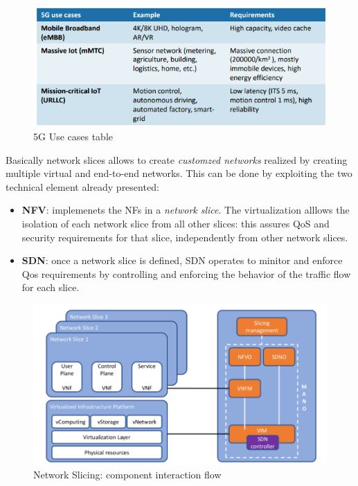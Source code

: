 \documentclass[10pt,a4paper]{report}
\theoremstyle{definition}
\begin{document}
\begin{figure}[h]
	\centering\includegraphics[scale=0.50]{images/Pasted image 20230420150151.png}
	\caption{5G Use cases table}
	\label{5g-use-cases-table}
\end{figure}
Basically network slices allows to create \textit{customzed networks} realized by creating multiple virtual and end-to-end networks.
This can be done by exploiting the two technical element already presented:
\begin{itemize}
	\item \textbf{NFV}: implemenets the NFs in a \textit{network slice}. The virtualization alllows the isolation of each network slice from all other slices: this assures QoS and security requirements for that slice, independently from other network slices.
	\item \textbf{SDN}: once a network slice is defined, SDN operates to minitor and enforce Qos requirements by controlling and enforcing the behavior of the traffic flow for each slice.

\end{itemize}
	\begin{figure}[h]
	\centering\includegraphics[scale=0.50]{images/Pasted image 20230420121716.png}
	\caption{Network Slicing: component interaction flow}
	\label{slicing-simple-components}
\end{figure}
\end{document}
